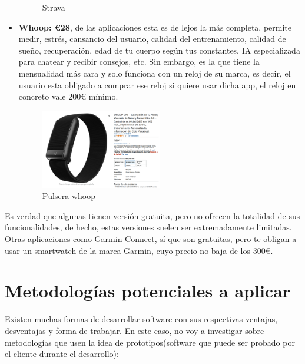 \begin{itemize}
\begin{figure}[H]
    \caption{Strava}
    \label{fig:Strava}
\end{figure} 
	\item \textbf{Whoop: €28}, de las aplicaciones esta es de lejos la más completa, permite medir, estrés, cansancio del usuario, calidad del entrenamiento, calidad de sueño, recuperación, edad de tu cuerpo según tus constantes, IA especializada para chatear y recibir consejos, etc. Sin embargo, es la que tiene la mensualidad más cara y solo funciona con un reloj de su marca, es decir, el usuario esta obligado a comprar ese reloj si quiere usar dicha app, el reloj en concreto vale 200€ mínimo.
\begin{figure}[H]
   \centering
    \includegraphics[width=0.5\textwidth]{fotos/Pulsera whoop.png}
    \caption{Pulsera whoop}
    \label{fig:Pulsera whoop}
\end{figure} 
\end{itemize}

Es verdad que algunas tienen versión gratuita, pero no ofrecen la totalidad de sus funcionalidades, de hecho, estas versiones suelen ser extremadamente limitadas. Otras aplicaciones como Garmin Connect, sí que son gratuitas, pero te obligan a usar un smartwatch de la marca Garmin, cuyo precio no baja de los 300€. 

\section{Metodologías potenciales a aplicar}

Existen muchas formas de desarrollar software con sus respectivas ventajas, desventajas y forma de trabajar. En este caso, no voy a investigar sobre metodologías que usen la idea de prototipos(software que puede ser probado por el cliente durante el desarrollo):

